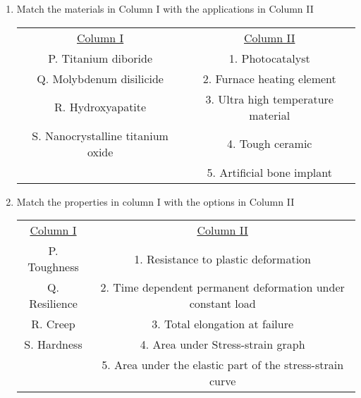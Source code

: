 \documentclass[journal]{IEEEtran}
\begin{document}
\begin{enumerate}[start=10]
\item %
Match the materials in Column I with the applications in Column II 
\begin{tabular}{c c}
\underline{Column I} & \underline{Column II} \\
P. Titanium diboride & 1. Photocatalyst \\
Q. Molybdenum disilicide & 2. Furnace heating element \\
R. Hydroxyapatite & 3. Ultra high temperature material \\
S. Nanocrystalline titanium oxide & 4. Tough ceramic \\
 & 5. Artificial bone implant \\
 \end{tabular}
\begin{enumerate}
\end{enumerate}

\item %
Match the properties in column I with the options in Column II \\
\begin{tabular}{c c}
\underline{Column I} & \underline{Column II} \\
P. Toughness & 1. Resistance to plastic deformation \\
Q. Resilience & 2. Time dependent permanent deformation under constant load \\
R. Creep & 3. Total elongation at failure \\
S. Hardness & 4. Area under Stress-strain graph \\
 & 5. Area under the elastic part of the stress-strain curve \\
 \end{tabular}
 \begin{enumerate}
\end{enumerate}


\end{enumerate}
\end{document}
